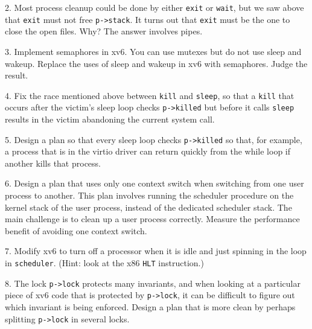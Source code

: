 2. Most process cleanup could be done by either
\lstinline{exit}
or
\lstinline{wait},
but we saw above that
\lstinline{exit}
must not free
\lstinline{p->stack}.
It turns out that
\lstinline{exit}
must be the one to close the open files.
Why?
The answer involves pipes.

3. Implement semaphores in xv6.
You can use mutexes but do not use sleep and wakeup.
Replace the uses of sleep and wakeup in xv6
with semaphores.  Judge the result.

4. Fix the race mentioned above between
\lstinline{kill}
and 
\lstinline{sleep},
so that a
\lstinline{kill}
that occurs after the victim's sleep loop checks
\lstinline{p->killed}
but before it calls
\lstinline{sleep}
results in the victim abandoning the current system call.

5. Design a plan so that every sleep loop checks 
\lstinline{p->killed}
so that, for example, a process that is in the virtio driver can return quickly from the while loop
if another kills that process.

6. Design a plan that uses only one context switch when switching from one user
process to another.  This plan involves running the scheduler procedure on the
kernel stack of the user process, instead of the dedicated scheduler stack.  The
main challenge is to clean up a user process correctly.  Measure the performance
benefit of avoiding one context switch.

7. Modify xv6 to turn off a processor when it is idle and just spinning in the
loop in
\lstinline{scheduler}.
(Hint: look at the x86
\lstinline{HLT}
instruction.)

8. The lock
\lstinline{p->lock}
protects many invariants, and when looking at a particular piece of xv6 code that
is protected by
\lstinline{p->lock},
it can be difficult to figure out which invariant is being enforced.  Design a
plan that is more clean by perhaps splitting
\lstinline{p->lock}
in several locks.

